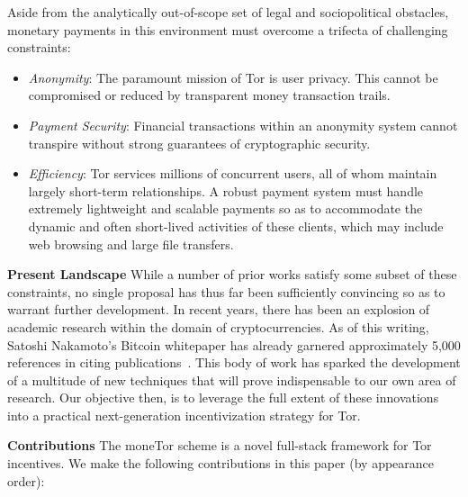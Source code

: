 Aside from the analytically out-of-scope set of legal and
sociopolitical obstacles, monetary payments in this environment must overcome a
trifecta of challenging constraints:

\begin{itemize}
\item \emph{Anonymity}: The paramount mission of Tor is user privacy. This
  cannot be compromised or reduced by transparent money transaction trails.
\item \emph{Payment Security}: Financial transactions within an anonymity system cannot transpire
  without strong guarantees of cryptographic security.
\item \emph{Efficiency}: Tor services millions of concurrent users, all of whom
  maintain largely short-term relationships. A robust payment system must handle
  extremely lightweight and scalable payments so as to accommodate the dynamic
  and often short-lived activities of these clients, which may include web
  browsing and large file transfers.
\end{itemize}

\textbf{Present Landscape} While a number of prior works satisfy some subset of
these constraints, no single proposal has thus far been sufficiently convincing
so as to warrant further development.
In recent years, there has been an explosion of academic
research within the domain of cryptocurrencies. As of this writing, Satoshi
Nakamoto's Bitcoin whitepaper has already garnered approximately 5,000 references in
citing publications~\cite{nakamoto2008bitcoin}.
  This body of work has sparked the development of a multitude of
new techniques that will prove indispensable to our own area of research. Our
objective then, is to leverage the full extent of these innovations into a
practical next-generation incentivization strategy for Tor.

\label{sec:Contributions}
\textbf{Contributions} The moneTor scheme is a novel full-stack framework for
Tor incentives. We make the following contributions in this paper (by appearance order):

